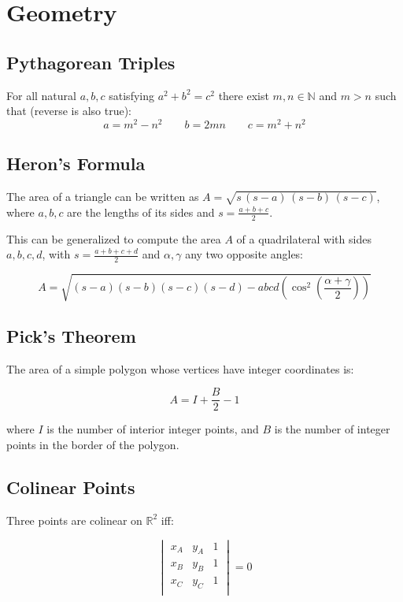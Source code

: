 \section{Geometry}
    
\subsection{Pythagorean Triples}

For all natural $a, b, c$ satisfying $a^2 + b^2 = c^2$ there exist $m, n \in \mathbb{N}$ and $m > n$ such that (reverse is also true):
$$a = m^2 - n^2 \qquad b = 2mn \qquad c = m^2 + n^2$$

\subsection{Heron's Formula}

The area of a triangle can be written as $A = \sqrt{s\,(s-a)\,(s-b)\,(s-c)}$, where $a, b, c$ are the lengths of its sides and $s = \frac{a+b+c}{2}$.

This can be generalized to compute the area $A$ of a quadrilateral with sides $a, b, c, d$, with $s = \frac{a+b+c+d}{2}$ and $\alpha, \gamma$ any two opposite angles:

$$ A = \sqrt{(s-a)(s-b)(s-c)(s-d) - abcd\left( \cos ^2 \left( \frac{\alpha+\gamma}{2} \right) \right)} $$

\subsection{Pick's Theorem}

The area of a simple polygon whose vertices have integer coordinates is:

\[
A = I + \frac{B}{2} - 1
\]

where $I$ is the number of interior integer points, and $B$ is the number of integer points in the border of the polygon.

\subsection{Colinear Points}

Three points are colinear on $\mathbb{R}^2$ iff:

$$ \begin{vmatrix}
x_A & y_A & 1 \\
x_B & y_B & 1 \\
x_C & y_C & 1 \\
\end{vmatrix}  = 0 $$

